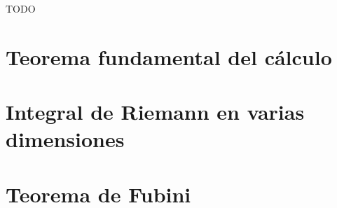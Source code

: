 TODO
\section{Teorema fundamental del cálculo}

\section{Integral de Riemann en varias dimensiones}

\section{Teorema de Fubini}
